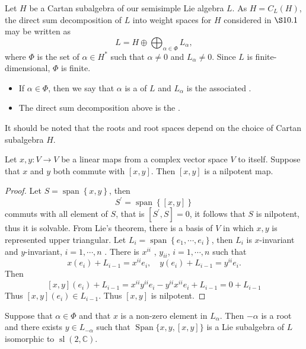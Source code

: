 \documentclass[../main.tex]{subfiles}
\begin{document}
\begin{definition}{}{}
    Let $H$ be a Cartan subalgebra of our semisimple Lie algebra $L$. As $H = C_L(H)$, the direct sum decomposition of $L$ into weight spaces for $H$ considered in $\S 10.1$ may be written as
\[
L = H \oplus \bigoplus_{\alpha \in \Phi} L_\alpha,
\]
where $\Phi$ is the set of $\alpha \in H^*$ such that $\alpha \neq 0$ and $L_\alpha \neq 0$. Since $L$ is finite-dimensional, $\Phi$ is finite.
\begin{itemize}
    \item 
If $\alpha \in \Phi$, then we say that $\alpha$ is a  of $L$ and $L_\alpha$ is the associated . 
\item The direct sum decomposition above is the . 
\end{itemize}

\end{definition}

\begin{remark}
    It should be noted that the roots and root spaces depend on the choice of Cartan subalgebra $H$.
\end{remark}


\begin{lemma}{}{}
    Let \(  x,y:V\to V  \) be a linear maps from a complex vector space \(  V  \) to itself. Suppose that \(  x  \) and \(  y  \) both commute with \(  \left[ x,y \right]   \). Then \(  \left[ x,y \right]   \) is a nilpotent map.      
\end{lemma}
\begin{proof}
    Let \(  S= \operatorname{span}\left\{ x,y \right\}  \), then \[
    S^{\prime} = \operatorname{span}\left\{ [x,y] \right\}
    \] commuts with all element of \(  S  \), that is \(  [S^{\prime} ,S]= 0  \), it follows that \(  S  \) is nilpotent, thus it is solvable. From Lie's theorem, there is a basis of \(  V  \) in which \(  x,y  \) is represented upper triangular. Let \(  L_{i}= \operatorname{span}\left\{  e_1,\cdots,e_i  \right\}  \), then \(  L_{i}  \) is \(  x  \)-invariant and \(  y  \)-invariant, \(  i=  1,\cdots,n   \)    . There is \(  x^{ii}   \) , \(  y_{ii}  \), \(  i=  1,\cdots,n   \)  such that   \[
    x\left( e_{i} \right)+ L_{i-1}= x^{ii}e_{i},\quad y\left( e_{i} \right)+ L_{i-1}=  y^{ii}e_{i}. 
    \]     Then \[
    [x,y]\left( e_{i} \right)+ L_{i-1}= x^{ii}y^{ii}e_{i}-y^{ii}x^{ii}e_{i}+ L_{i-1}= 0+ L_{i-1} 
    \] Thus \(  \left[ x,y \right]\left( e_{i} \right)\in L_{i-1}    \). Thus \(  \left[ x,y \right]   \) is nilpotent. 
\end{proof}
\begin{lemma}{}{}
Suppose that $\alpha \in \Phi$ and that $x$ is a non-zero element in $L_{\alpha}$. Then $-\alpha$ is a root and there exists $y \in L_{-\alpha}$ such that $\operatorname{Span}\{x, y, [x, y]\}$ is a Lie subalgebra of $L$ isomorphic to $\operatorname{sl}(2, \mathbb{C})$.
\end{lemma}
\end{document}
